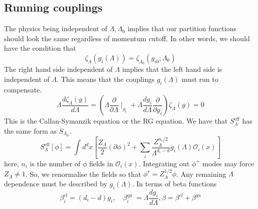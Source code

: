 \documentclass[11pt, oneside]{article}   	%
\theoremstyle{slanted}
\begin{document}
\subsection{Running couplings}
The physics being independent of $ \Lambda , \Lambda _ 0 $ 
implies that our partition functions should 
look the same 
regardless of momentum cutoff. 
In other words, we should have the condition 
that 
\[
\zeta_{ \Lambda } \left( g _ i 
\left(  \Lambda  \right)  \right)   = \zeta_{ \Lambda _ 0 } 
\left(  g _{ i 0   } ; \Lambda _ 0  \right) 
\] The right hand side independent 
of $ \Lambda $ implies that the left hand side is independent 
of $ \Lambda $. 
This means that the couplings $ g _ i \left(  \Lambda  \right)  $ 
must run to compensate. 
\[
\Lambda \frac{ d \zeta _{ \Lambda } \left(  g  \right)  }{ 
d \Lambda }  = \left( \Lambda \frac{\partial   }{\partial  \Lambda }  
\mid _{ g _ i } + \Lambda \frac{ d g _ i }{ d \Lambda } \frac{\partial   }{\partial  g _ i }  \right)
\zeta _{ \Lambda } \left( g  \right)   = 0 
\] This is the Callan-Symanzik equation 
or the RG equation. 
We have that $ S _{ \Lambda } ^{ \text{eff}}$ has 
the same form as $ S _{ \Lambda _ 0 } $. 
\[
S _{ \Lambda } ^{ \text{eff}} \left[  \phi  \right]   = 
\int d ^ d x \left[  \frac{Z _{ \Lambda } }{ 2 } 
\left( \partial  \phi  \right)  ^ 2 + \sum _ i \frac{
Z _{ \Lambda } ^{ n _ i  / 2 }  }{\Lambda ^{ d _ i - d } } g _ i 
\left(  \Lambda  \right)  \mathcal{ O } _ i \left( x  \right) \right]  
\] here, $ n _ i $ is the number of 
$ \phi $ fields in $ \mathcal{ O } _ i \left(  x  \right)  $. 
Integrating out $ \phi ^ +  $ modes 
may force $ Z_{ \Lambda } \neq 1 $. 
So, we renormalise the fields so that 
$ \phi ^ r  = Z _{ \Lambda } ^{ 1 / 2 } \phi $. 
Any remaining $ \Lambda $ dependence must be 
described by $ g _ i \left( \Lambda  \right)  $. 
In terms 
of beta functions 
\[
\beta ^{ \text{cl} }_ i  = (d _ i  - d)g_i , \quad 
\beta ^{ \text{qu }} _ i  = \Lambda \frac{d g _ i }{ d \Lambda } , 
\beta  = \beta ^{ cl } + \beta ^{ qu } 
\] 
\end{document}
